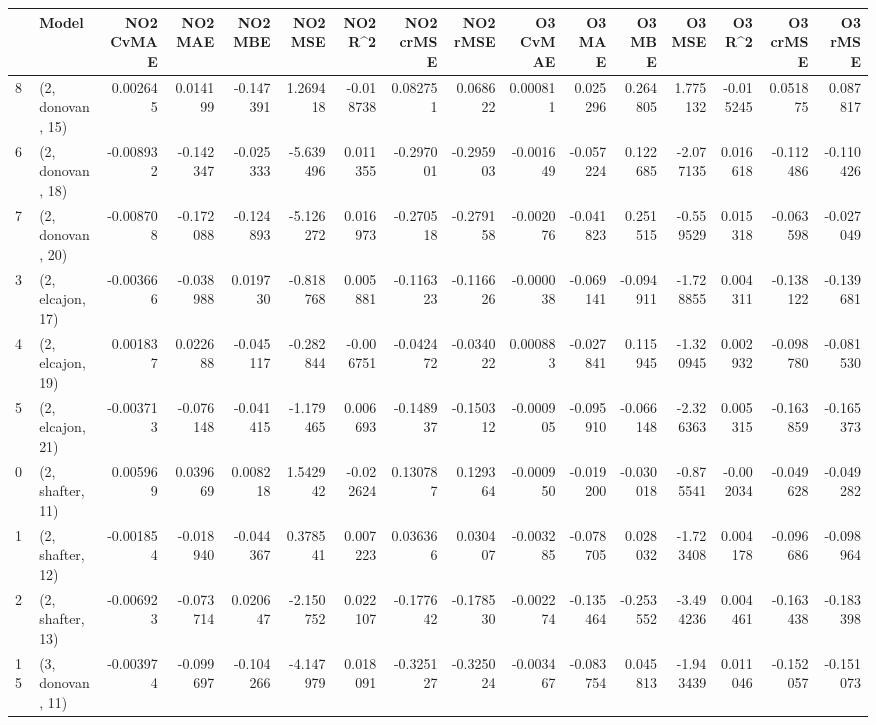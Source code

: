 \begin{tabular}{llrrrrrrrrrrrrrr}
\toprule
{} &             Model &  NO2 CvMAE &   NO2 MAE &   NO2 MBE &    NO2 MSE &   NO2 R\textasciicircum2 &  NO2 crMSE &  NO2 rMSE &  O3 CvMAE &    O3 MAE &    O3 MBE &     O3 MSE &    O3 R\textasciicircum2 &  O3 crMSE &   O3 rMSE \\
\midrule
8  &  (2, donovan, 15) &   0.002645 &  0.014199 & -0.147391 &   1.269418 & -0.018738 &   0.082751 &  0.068622 &  0.000811 &  0.025296 &  0.264805 &   1.775132 & -0.015245 &  0.051875 &  0.087817 \\
6  &  (2, donovan, 18) &  -0.008932 & -0.142347 & -0.025333 &  -5.639496 &  0.011355 &  -0.297001 & -0.295903 & -0.001649 & -0.057224 &  0.122685 &  -2.077135 &  0.016618 & -0.112486 & -0.110426 \\
7  &  (2, donovan, 20) &  -0.008708 & -0.172088 & -0.124893 &  -5.126272 &  0.016973 &  -0.270518 & -0.279158 & -0.002076 & -0.041823 &  0.251515 &  -0.559529 &  0.015318 & -0.063598 & -0.027049 \\
3  &  (2, elcajon, 17) &  -0.003666 & -0.038988 &  0.019730 &  -0.818768 &  0.005881 &  -0.116323 & -0.116626 & -0.000038 & -0.069141 & -0.094911 &  -1.728855 &  0.004311 & -0.138122 & -0.139681 \\
4  &  (2, elcajon, 19) &   0.001837 &  0.022688 & -0.045117 &  -0.282844 & -0.006751 &  -0.042472 & -0.034022 &  0.000883 & -0.027841 &  0.115945 &  -1.320945 &  0.002932 & -0.098780 & -0.081530 \\
5  &  (2, elcajon, 21) &  -0.003713 & -0.076148 & -0.041415 &  -1.179465 &  0.006693 &  -0.148937 & -0.150312 & -0.000905 & -0.095910 & -0.066148 &  -2.326363 &  0.005315 & -0.163859 & -0.165373 \\
0  &  (2, shafter, 11) &   0.005969 &  0.039669 &  0.008218 &   1.542942 & -0.022624 &   0.130787 &  0.129364 & -0.000950 & -0.019200 & -0.030018 &  -0.875541 & -0.002034 & -0.049628 & -0.049282 \\
1  &  (2, shafter, 12) &  -0.001854 & -0.018940 & -0.044367 &   0.378541 &  0.007223 &   0.036366 &  0.030407 & -0.003285 & -0.078705 &  0.028032 &  -1.723408 &  0.004178 & -0.096686 & -0.098964 \\
2  &  (2, shafter, 13) &  -0.006923 & -0.073714 &  0.020647 &  -2.150752 &  0.022107 &  -0.177642 & -0.178530 & -0.002274 & -0.135464 & -0.253552 &  -3.494236 &  0.004461 & -0.163438 & -0.183398 \\
15 &  (3, donovan, 11) &  -0.003974 & -0.099697 & -0.104266 &  -4.147979 &  0.018091 &  -0.325127 & -0.325024 & -0.003467 & -0.083754 &  0.045813 &  -1.943439 &  0.011046 & -0.152057 & -0.151073 \\

\end{tabular}
